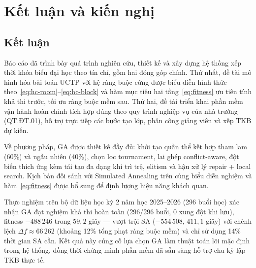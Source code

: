 \documentclass[a4paper,12pt,oneside]{article}
\begin{document}
	\section*{Kết luận và kiến nghị}
	
\subsection*{Kết luận}

	Báo cáo đã trình bày quá trình nghiên cứu, thiết kế và xây dựng hệ thống xếp thời khóa biểu đại học theo tín chỉ, gồm hai đóng góp chính. Thứ nhất, đề tài mô hình hóa bài toán UCTP với hệ ràng buộc cứng được biểu diễn hình thức theo~\eqref{eq:hc-room}--\eqref{eq:hc-block} và hàm mục tiêu hai tầng~\eqref{eq:fitness} ưu tiên tính khả thi trước, tối ưu ràng buộc mềm sau. Thứ hai, đề tài triển khai phần mềm vận hành hoàn chỉnh tích hợp đúng theo quy trình nghiệp vụ của nhà trường (QT.ĐT.01), hỗ trợ trực tiếp các bước tạo lớp, phân công giảng viên và xếp TKB dự kiến.

	Về phương pháp, GA được thiết kế đầy đủ: khởi tạo quần thể kết hợp tham lam (60\%) và ngẫu nhiên (40\%), chọn lọc tournament, lai ghép conflict-aware, đột biến thích ứng kèm tái tạo đa dạng khi trì trệ, elitism và hậu xử lý repair + local search. Kịch bản đối sánh với Simulated Annealing trên cùng biểu diễn nghiệm và hàm~\eqref{eq:fitness} được bổ sung để định lượng hiệu năng khách quan.

	Thực nghiệm trên bộ dữ liệu học kỳ 2 năm học 2025--2026 (296 buổi học) xác nhận GA đạt nghiệm khả thi hoàn toàn (296/296 buổi, 0 xung đột khi lưu), fitness $-488\,246$ trong $59{,}2$ giây --- vượt trội SA ($-554\,508$, $411{,}1$ giây) với chênh lệch $\Delta f \approx 66\,262$ (khoảng 12\% tổng phạt ràng buộc mềm) và chỉ sử dụng 14\% thời gian SA cần. Kết quả này củng cố lựa chọn GA làm thuật toán lõi mặc định trong hệ thống, đồng thời chứng minh phần mềm đã sẵn sàng hỗ trợ chu kỳ lập TKB thực tế.
\end{document}
